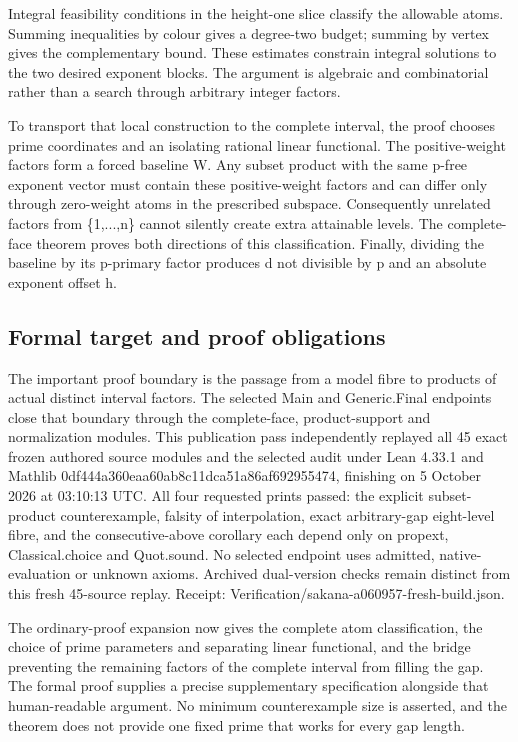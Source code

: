 \documentclass[11pt,a4paper]{article}
\begin{document}
Integral feasibility conditions in the height-one slice classify the allowable atoms. Summing inequalities by colour gives a degree-two budget; summing by vertex gives the complementary bound. These estimates constrain integral solutions to the two desired exponent blocks. The argument is algebraic and combinatorial rather than a search through arbitrary integer factors.

To transport that local construction to the complete interval, the proof chooses prime coordinates and an isolating rational linear functional. The positive-weight factors form a forced baseline W. Any subset product with the same p-free exponent vector must contain these positive-weight factors and can differ only through zero-weight atoms in the prescribed subspace. Consequently unrelated factors from \{1,...,n\} cannot silently create extra attainable levels. The complete-face theorem proves both directions of this classification. Finally, dividing the baseline by its p-primary factor produces d not divisible by p and an absolute exponent offset h.

\subsection{Formal target and proof obligations}
The important proof boundary is the passage from a model fibre to products of actual distinct interval factors. The selected Main and Generic.Final endpoints close that boundary through the complete-face, product-support and normalization modules. This publication pass independently replayed all 45 exact frozen authored source modules and the selected audit under Lean 4.33.1 and Mathlib 0df444a360eaa60ab8c11dca51a86af692955474, finishing on 5 October 2026 at 03:10:13 UTC. All four requested prints passed: the explicit subset-product counterexample, falsity of interpolation, exact arbitrary-gap eight-level fibre, and the consecutive-above corollary each depend only on propext, Classical.choice and Quot.sound. No selected endpoint uses admitted, native-evaluation or unknown axioms. Archived dual-version checks remain distinct from this fresh 45-source replay. Receipt: Verification/sakana-a060957-fresh-build.json.

The ordinary-proof expansion now gives the complete atom classification, the choice of prime parameters and separating linear functional, and the bridge preventing the remaining factors of the complete interval from filling the gap. The formal proof supplies a precise supplementary specification alongside that human-readable argument. No minimum counterexample size is asserted, and the theorem does not provide one fixed prime that works for every gap length.
\end{document}
